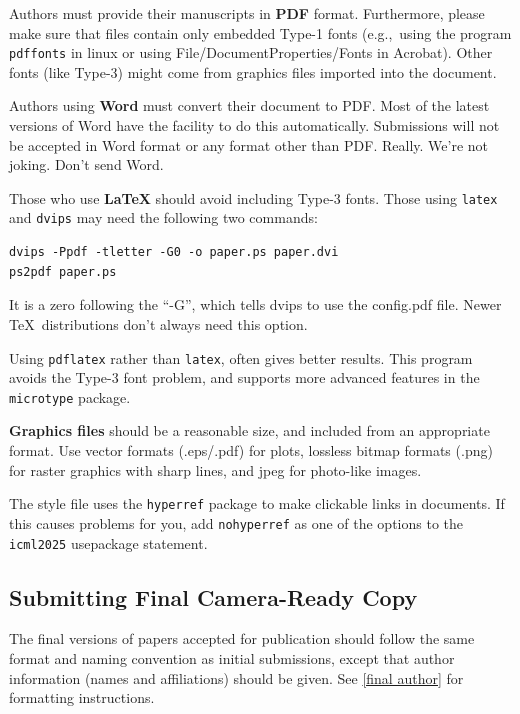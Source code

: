 \documentclass{article}
\theoremstyle{plain}
\theoremstyle{definition}
\theoremstyle{remark}
\begin{document}
\medskip

Authors must provide their manuscripts in \textbf{PDF} format.
Furthermore, please make sure that files contain only embedded Type-1 fonts
(e.g.,~using the program \texttt{pdffonts} in linux or using
File/DocumentProperties/Fonts in Acrobat). Other fonts (like Type-3)
might come from graphics files imported into the document.

Authors using \textbf{Word} must convert their document to PDF\@. Most
of the latest versions of Word have the facility to do this
automatically. Submissions will not be accepted in Word format or any
format other than PDF\@. Really. We're not joking. Don't send Word.

Those who use \textbf{\LaTeX} should avoid including Type-3 fonts.
Those using \texttt{latex} and \texttt{dvips} may need the following
two commands:

{\footnotesize
\begin{verbatim}
dvips -Ppdf -tletter -G0 -o paper.ps paper.dvi
ps2pdf paper.ps
\end{verbatim}}
It is a zero following the ``-G'', which tells dvips to use
the config.pdf file. Newer \TeX\ distributions don't always need this
option.

Using \texttt{pdflatex} rather than \texttt{latex}, often gives better
results. This program avoids the Type-3 font problem, and supports more
advanced features in the \texttt{microtype} package.

\textbf{Graphics files} should be a reasonable size, and included from
an appropriate format. Use vector formats (.eps/.pdf) for plots,
lossless bitmap formats (.png) for raster graphics with sharp lines, and
jpeg for photo-like images.

The style file uses the \texttt{hyperref} package to make clickable
links in documents. If this causes problems for you, add
\texttt{nohyperref} as one of the options to the \texttt{icml2025}
usepackage statement.

\subsection{Submitting Final Camera-Ready Copy}

The final versions of papers accepted for publication should follow the
same format and naming convention as initial submissions, except that
author information (names and affiliations) should be given. See
\cref{final author} for formatting instructions.
\end{document}
